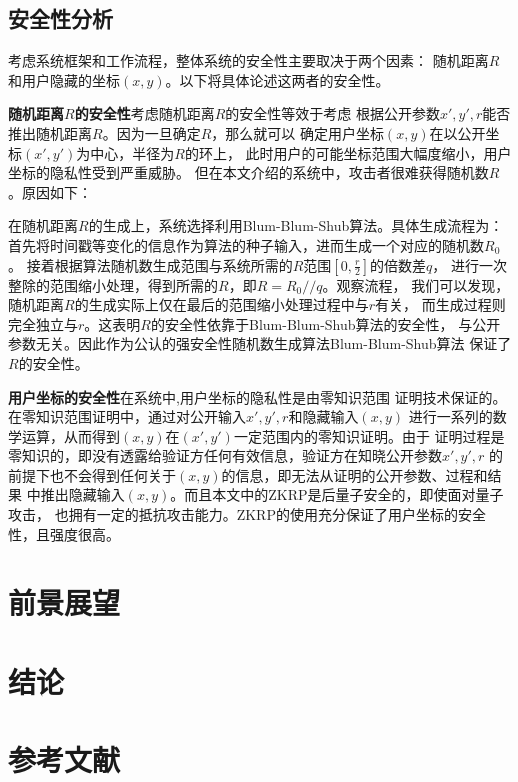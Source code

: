 \documentclass[zihao=-4]{ctexart}
\begin{document}
\subsection{安全性分析}
考虑系统框架和工作流程，整体系统的安全性主要取决于两个因素：
随机距离$R$和用户隐藏的坐标$(x,y)$。以下将具体论述这两者的安全性。\par
\textbf{随机距离$R$的安全性}\quad 考虑随机距离$R$的安全性等效于考虑
根据公开参数$x',y',r$能否推出随机距离$R$。因为一旦确定$R$，那么就可以
确定用户坐标$(x,y)$在以公开坐标$(x',y')$为中心，半径为$R$的环上，
此时用户的可能坐标范围大幅度缩小，用户坐标的隐私性受到严重威胁。
但在本文介绍的系统中，攻击者很难获得随机数$R$。原因如下：\par
在随机距离$R$的生成上，系统选择利用Blum-Blum-Shub算法。具体生成流程为：
首先将时间戳等变化的信息作为算法的种子输入，进而生成一个对应的随机数$R_0$。
接着根据算法随机数生成范围与系统所需的$R$范围$[0,\frac{r}{2}]$的倍数差$q$，
进行一次整除的范围缩小处理，得到所需的$R$，即$R=R_0//q$。观察流程，
我们可以发现，随机距离$R$的生成实际上仅在最后的范围缩小处理过程中与$r$有关，
而生成过程则完全独立与$r$。这表明$R$的安全性依靠于Blum-Blum-Shub算法的安全性，
与公开参数无关。因此作为公认的强安全性随机数生成算法Blum-Blum-Shub算法
保证了$R$的安全性。\par
\textbf{用户坐标的安全性}\quad 在系统中,用户坐标的隐私性是由零知识范围
证明技术保证的。在零知识范围证明中，通过对公开输入$x',y',r$和隐藏输入$(x,y)$
进行一系列的数学运算，从而得到$(x,y)$在$(x',y')$一定范围内的零知识证明。由于
证明过程是零知识的，即没有透露给验证方任何有效信息，验证方在知晓公开参数$x',y',r$
的前提下也不会得到任何关于$(x,y)$的信息，即无法从证明的公开参数、过程和结果
中推出隐藏输入$(x,y)$。而且本文中的ZKRP是后量子安全的，即使面对量子攻击，
也拥有一定的抵抗攻击能力。ZKRP的使用充分保证了用户坐标的安全性，且强度很高。
\section{前景展望}

\section{结论}

\section{参考文献}
\end{document}
